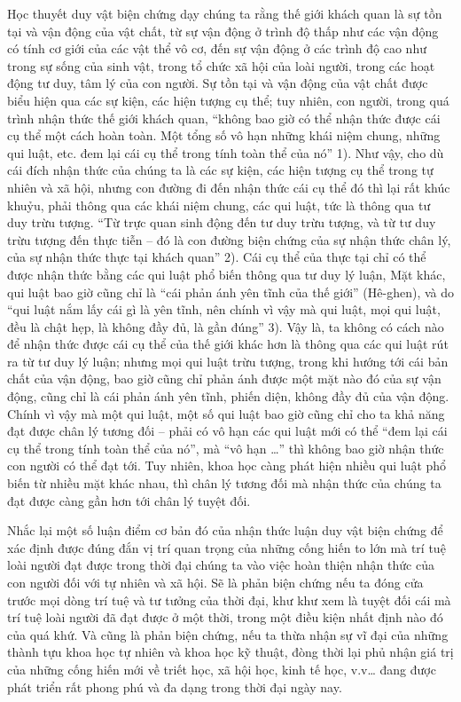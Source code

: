Học thuyết duy vật biện chứng dạy chúng ta rằng thế giới khách quan là sự tồn tại và vận động của vật chất, từ sự vận động ở trình độ thấp như các vận động có tính cơ giới của các vật thể vô cơ, đến sự vận động ở các trình độ cao như trong sự sống của sinh vật, trong tổ chức xã hội của loài người, trong các hoạt động tư duy, tâm lý của con người. Sự tồn tại và vận động của vật chất được biểu hiện qua các sự kiện, các hiện tượng cụ thể; tuy nhiên, con người, trong quá trình nhận thức thế giới khách quan, “không bao giờ có thể nhận thức được cái cụ thể một cách hoàn toàn. Một tổng số vô hạn những khái niệm chung, những qui luật, etc. đem lại cái cụ thể trong tính toàn thể của nó” 1). Như vậy, cho dù cái đích nhận thức của chúng ta là các sự kiện, các hiện tượng cụ thể trong tự nhiên và xã hội, nhưng con đường đi đến nhận thức cái cụ thể đó thì lại rất khúc khuỷu, phải thông qua các khái niệm chung, các qui luật, tức là thông qua tư duy trừu tượng. “Từ trực quan sinh động đến tư duy trừu tượng, và từ tư duy trừu tượng đến thực tiễn – đó là con đường biện chứng của sự nhận thức chân lý, của sự nhận thức thực tại khách quan” 2). Cái cụ thể của thực tại chỉ có thể được nhận thức bằng các qui luật phổ biến thông qua tư duy lý luận, Mặt khác, qui luật bao giờ cũng chỉ là “cái phản ánh yên tĩnh của thế giới” (Hê-ghen), và do “qui luật nắm lấy cái gì là yên tĩnh, nên chính vì vậy mà qui luật, mọi qui luật, đều là chật hẹp, là không đầy đủ, là gần đúng” 3). Vậy là, ta không có cách nào để nhận thức được cái cụ thể của thế giới khác hơn là thông qua các qui luật rút ra từ tư duy lý luận; nhưng mọi qui luật trừu tượng, trong khi hướng tới cái bản chất của vận động, bao giờ cũng chỉ phản ánh được một mặt nào đó của sự vận động, cũng chỉ là cái phản ánh yên tĩnh, phiến diện, không đầy đủ của vận động. Chính vì vậy mà một qui luật, một số qui luật bao giờ cũng chỉ cho ta khả năng đạt được chân lý tương đối – phải có vô hạn các qui luật mới có thể “đem lại cái cụ thể trong tính toàn thể của nó”, mà “vô hạn …” thì không bao giờ nhận thức con người có thể đạt tới. Tuy nhiên, khoa học càng phát hiện nhiều qui luật phổ biến từ nhiều mặt khác nhau, thì chân lý tương đối mà nhận thức của chúng ta đạt được càng gần hơn tới chân lý tuyệt đối.

Nhắc lại một số luận điểm cơ bản đó của nhận thức luận duy vật biện chứng để xác định được đúng đắn vị trí quan trọng của những cống hiến to lớn mà trí tuệ loài người đạt được trong thời đại chúng ta vào việc hoàn thiện nhận thức của con người đối với tự nhiên và xã hội. Sẽ là phản biện chứng nếu ta đóng cửa trước mọi dòng trí tuệ và tư tưởng của thời đại, khư khư xem là tuyệt đối cái mà trí tuệ loài người đã đạt được ở một thời, trong một điều kiện nhất định nào đó của quá khứ. Và cũng là phản biện chứng, nếu ta thừa nhận sự vĩ đại của những thành tựu khoa học tự nhiên và khoa học kỹ thuật, đòng thời lại phủ nhận giá trị của những cống hiến mới về triết học, xã hội học, kinh tế học, v.v… đang được phát triển rất phong phú và đa dạng trong thời đại ngày nay.

